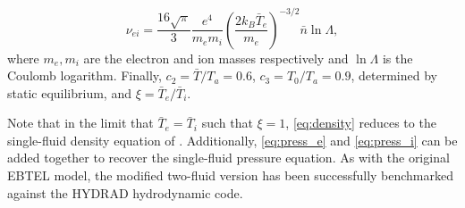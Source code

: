 \documentclass[apj]{emulateapj}
\begin{document}
		\begin{equation}
			\nu_{ei} = \frac{16\sqrt{\pi}}{3}\frac{e^4}{m_em_i}\left(\frac{2k_B\bar{T}_e}{m_e}\right)^{-3/2}\bar{n}\ln{\Lambda},
			\label{eq:col_freq}
		\end{equation}
		where $m_e,m_i$ are the electron and ion masses respectively and $\ln{\Lambda}$ is the Coulomb logarithm. Finally, $c_2=\bar{T}/T_a=0.6$, $c_3=T_0/T_a=0.9$, determined by static equilibrium, and $\xi=\bar{T}_e/\bar{T}_i$.
		\par Note that in the limit that $\bar{T}_e=\bar{T}_i$ such that $\xi=1$, \autoref{eq:density} reduces to the single-fluid density equation of \citet{cargill_enthalpy-based_2012}. Additionally, \autoref{eq:press_e} and \autoref{eq:press_i} can be added together to recover the single-fluid pressure equation. As with the original EBTEL model, the modified two-fluid version has been successfully benchmarked against the HYDRAD hydrodynamic code.
	
	
	\clearpage
\end{document}
